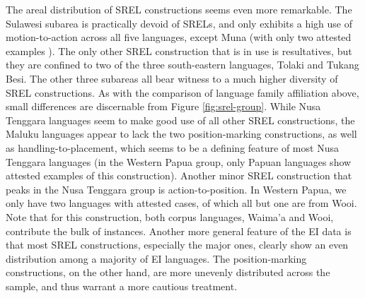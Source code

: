 The areal distribution of SREL constructions seems even more remarkable. The Sulawesi subarea is practically devoid of SRELs, and only exhibits a high use of motion-to-action across all five languages, except Muna (with only two attested examples%
). The only other SREL construction that is in use is resultatives, but they are confined to two of the three south-eastern languages, Tolaki and Tukang Besi. The other three subareas all bear witness to a much higher diversity of SREL constructions. As with the comparison of language family affiliation above, small differences are discernable from Figure \ref{fig:srel-group}. While Nusa Tenggara languages seem to make good use of all other SREL constructions, the Maluku languages appear to lack the two position-marking constructions, as well as handling-to-placement, which seems to be a defining feature of most Nusa Tenggara languages (in the Western Papua group, only Papuan languages show attested examples of this construction). Another minor SREL construction that peaks in the Nusa Tenggara group is action-to-position. In Western Papua, we only have two languages with attested cases, of which all but one are from Wooi. Note that for this construction, both corpus languages, Waima'a and Wooi, contribute the bulk of instances. Another more general feature of the EI data %
is that most SREL constructions, especially the major ones, clearly show an even distribution among a majority of EI languages. The position-marking constructions, on the other hand, are more unevenly distributed across the sample, and thus warrant a more cautious treatment.

